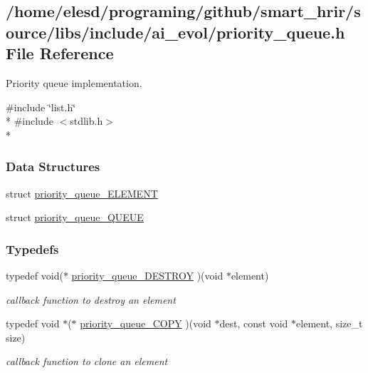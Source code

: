 \hypertarget{a00011}{\subsection{/home/elesd/programing/github/smart\-\_\-hrir/source/libs/include/ai\-\_\-evol/priority\-\_\-queue.h File Reference}
\label{a00011}
}


Priority queue implementation.  


{\ttfamily \#include \char`\"{}list.\-h\char`\"{}}\\*
{\ttfamily \#include $<$stdlib.\-h$>$}\\*
\subsubsection*{Data Structures}
\begin{DoxyCompactItemize}
\item 
struct \hyperlink{a00006}{priority\-\_\-queue\-\_\-\-E\-L\-E\-M\-E\-N\-T}
\item 
struct \hyperlink{a00007}{priority\-\_\-queue\-\_\-\-Q\-U\-E\-U\-E}
\end{DoxyCompactItemize}
\subsubsection*{Typedefs}
\begin{DoxyCompactItemize}
\item 
typedef void($\ast$ \hyperlink{a00011_a8b0749461227267e0856a15ce59854c1}{priority\-\_\-queue\-\_\-\-D\-E\-S\-T\-R\-O\-Y} )(void $\ast$element)
\begin{DoxyCompactList}\small\item\em callback function to destroy an element \end{DoxyCompactList}\item 
typedef void $\ast$($\ast$ \hyperlink{a00011_a8be2278e923a91d0166c68a26e438ee0}{priority\-\_\-queue\-\_\-\-C\-O\-P\-Y} )(void $\ast$dest, const void $\ast$element, size\-\_\-t size)
\begin{DoxyCompactList}\small\item\em callback function to clone an element \end{DoxyCompactList}\end{DoxyCompactItemize}
